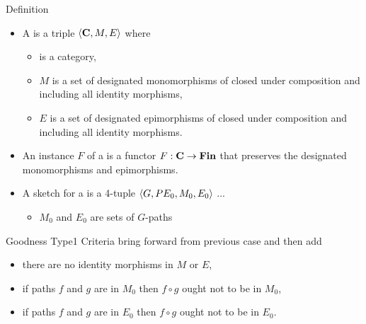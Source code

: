 
\iffalse %
\begin{frame}{Definition}
A \term{category with epi-mono splits} is a category such that for all $f:x \morph y$
in \catcw there exists an object $img(f)$, an epimorphism $f_e:x \morph img(f)$
and a monomorphism $f_m:img(f) \morph y$ such that
\scalebox{0.9}{\roomup{1.3cm}\epimonosplitdiagram{x}{y}{f}}
commutes. 

An \term{instance} of a category with epi-mono splits \catcw is a functor from 
\catcw to the category $\Fin$ of finite sets and functions that preserves epimorphims and monomorphisms.
\end{frame}
\fi


\begin{frame}{Definition}
\begin{itemize}
\item A \term{\catMEterm} is a triple $\langle\textbf{C},M,E\rangle$ where 
\begin{itemize}
\item \catcw is a category,
\item $M$ is a set of designated monomorphisms of \catc closed under composition and including all identity morphisms,
\item $E$ is a set of designated epimorphisms of \catc closed under composition and including all identity morphisms.
\end{itemize}
\item An instance $F$ of a \catMEterm is a functor $F: \textbf{C} \rightarrow \textbf{Fin}$ 
that preserves the designated monomorphisms and epimorphisms.


\item A sketch for a \catMEterm is a 4-tuple $\langle G,PE_0,M_0,E_0\rangle$ ...
\begin{itemize}
 \item   $M_0$ and $E_0$ are sets of $G$-paths  
\end{itemize}
\end{itemize}
\end{frame}

\begin{frame}{Goodness Type1 Criteria}
bring forward from previous case and then add
\begin{itemize}
    \item there are no identity morphisms in $M$ or $E$,
\item if paths $f$ and $g$ are in $M_0$ then $f \circ g$ ought not to be in $M_0$,
\item if paths $f$ and $g$ are in $E_0$ then $f \circ g$ ought not to be in $E_0$.
\end{itemize}
\end{frame}

